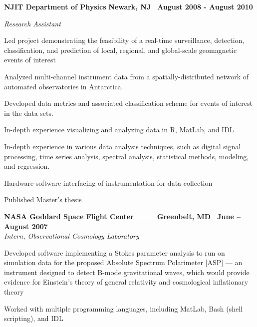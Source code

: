 \documentclass[10pt]{article}
\newcommand{\leftandright}[2]{\noindent\textbf{#1}\hfill
\textbf{#2}}
\begin{document}
\leftandright{NJIT Department of Physics}{Newark, NJ \textbullet\, 
August 2008 - August 2010} \par
\textit{Research Assistant }
\vspace{-0.8em}
\begin{itemize*}
  \item Led project demonstrating the feasibility of a real-time
    surveillance, detection, classification, and prediction of 
    local, regional, and global-scale geomagnetic events of interest
  \item
    Analyzed multi-channel instrument data from a spatially-distributed
    network of automated observatories in Antarctica.
  \item Developed data metrics and associated classification scheme for
    events of interest in the data sets.
  \item In-depth experience visualizing and analyzing data in R, MatLab,
    and IDL
  \item In-depth experience in various data analysis techniques,
    such as digital signal processing, time series analysis, spectral analysis,
    statistical methods, modeling, and regression.
  \item Hardware-software interfacing of instrumentation for data
    collection
  \item Published Master's thesis
\end{itemize*}

\leftandright{NASA Goddard Space Flight Center }{ }
\leftandright{\textcolor{white}{space} }{Greenbelt, MD \textbullet\, June -- August 2007}\\  
\vspace{-0.8em}
\textit{Intern, Observational Cosmology Laboratory} 
\begin{itemize*}
  \item Developed software implementing a Stokes parameter analysis to
    run on simulation data for the proposed Absolute Spectrum
    Polarimeter [ASP] --- an instrument designed to detect B-mode
    gravitational waves, which would provide evidence for Einstein's
    theory of general relativity and cosmological inflationary theory
  \item Worked with multiple programming languages, including MatLab,
    Bash (shell scripting), and IDL 
\end{itemize*}
\end{document}
